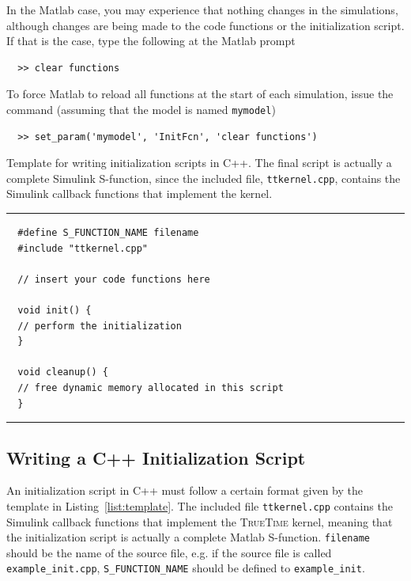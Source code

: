 \documentclass[final,twoside]{rapport}
\begin{document}
In the Matlab case, you may experience that nothing changes in the
simulations, although changes are being made to the code functions or
the initialization script. If that is the case, type the following at
the Matlab prompt

\begin{small}
\begin{verbatim}
  >> clear functions
\end{verbatim}
\end{small}

To force Matlab to reload all functions at the start of each
simulation, issue the command (assuming that the model is named
\texttt{mymodel})

\begin{small}
\begin{verbatim}
  >> set_param('mymodel', 'InitFcn', 'clear functions')
\end{verbatim}
\end{small}

\begin{listing}[t]\small
\caption{Template for writing initialization scripts in C++. The final
  script is actually a complete Simulink S-function, since the included
  file, \texttt{ttkernel.cpp}, contains the Simulink callback functions
  that implement the kernel.}
\label{list:template}
\vspace{3mm}
\hrule
\begin{verbatim}
  #define S_FUNCTION_NAME filename
  #include "ttkernel.cpp"

  // insert your code functions here

  void init() {
  // perform the initialization
  }

  void cleanup() {
  // free dynamic memory allocated in this script
  }
\end{verbatim}
\hrule
\end{listing}


\subsection{Writing a C++ Initialization Script}
An initialization script in C++ must follow a certain format given by
the template in Listing~\ref{list:template}. The included file
\texttt{ttkernel.cpp} contains the Simulink callback functions that
implement the \textsc{TrueTime} kernel, meaning that the
initialization script is actually a complete Matlab S-function.
\texttt{filename} should be the name of the source file, e.g. if the
source file is called \texttt{example\_init.cpp},
\texttt{S\_FUNCTION\_NAME} should be defined to
\texttt{example\_init}.
\end{document}
